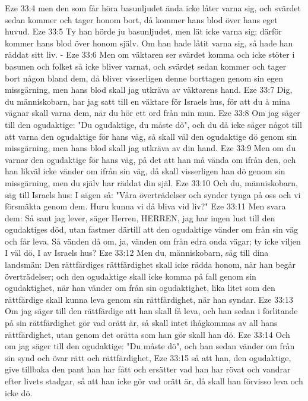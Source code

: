 Eze 33:4  men den som får höra basunljudet ända icke låter varna sig, och svärdet sedan kommer och tager honom bort, då kommer hans blod över hans eget huvud.
Eze 33:5  Ty han hörde ju basunljudet, men lät icke varna sig; därför kommer hans blod över honom själv. Om han hade låtit varna sig, så hade han räddat sitt liv. -
Eze 33:6  Men om väktaren ser svärdet komma och icke stöter i basunen och folket så icke bliver varnat, och svärdet sedan kommer och tager bort någon bland dem, då bliver visserligen denne borttagen genom sin egen missgärning, men hans blod skall jag utkräva av väktarens hand.
Eze 33:7  Dig, du människobarn, har jag satt till en väktare för Israels hus, för att du å mina vägnar skall varna dem, när du hör ett ord från min mun.
Eze 33:8  Om jag säger till den ogudaktige: "Du ogudaktige, du måste dö", och du då icke säger något till att varna den ogudaktige för hans väg, så skall väl den ogudaktige dö genom sin missgärning, men hans blod skall jag utkräva av din hand.
Eze 33:9  Men om du varnar den ogudaktige för hans väg, på det att han må vända om ifrån den, och han likväl icke vänder om ifrån sin väg, då skall visserligen han dö genom sin missgärning, men du själv har räddat din själ.
Eze 33:10  Och du, människobarn, säg till Israels hus: I sägen så: "Våra överträdelser och synder tynga på oss och vi försmäkta genom dem. Huru kunna vi då bliva vid liv?"
Eze 33:11  Men svara dem: Så sant jag lever, säger Herren, HERREN, jag har ingen lust till den ogudaktiges död, utan fastmer därtill att den ogudaktige vänder om från sin väg och får leva. Så vänden då om, ja, vänden om från edra onda vägar; ty icke viljen I väl dö, I av Israels hus?
Eze 33:12  Men du, människobarn, säg till dina landsmän: Den rättfärdiges rättfärdighet skall icke rädda honom, när han begår överträdelser; och den ogudaktige skall icke komma på fall genom sin ogudaktighet, när han vänder om från sin ogudaktighet, lika litet som den rättfärdige skall kunna leva genom sin rättfärdighet, när han syndar.
Eze 33:13  Om jag säger till den rättfärdige att han skall få leva, och han sedan i förlitande på sin rättfärdighet gör vad orätt är, så skall intet ihågkommas av all hans rättfärdighet, utan genom det orätta som han gör skall han dö.
Eze 33:14  Och om jag säger till den ogudaktige: "Du måste dö", och han sedan vänder om från sin synd och övar rätt och rättfärdighet,
Eze 33:15  så att han, den ogudaktige, give tillbaka den pant han har fått och ersätter vad han har rövat och vandrar efter livets stadgar, så att han icke gör vad orätt är, då skall han förvisso leva och icke dö.
